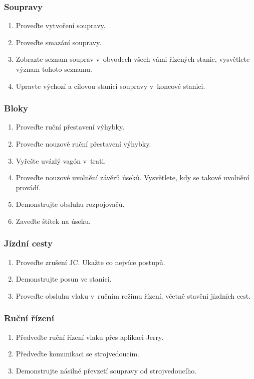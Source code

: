 \documentclass[12pt,a4paper]{article}
\begin{document}
\subsubsection*{Soupravy}
\begin{enumerate}[leftmargin=*]
\item Proveďte vytvoření soupravy.
\item Proveďte smazání soupravy.
\item Zobrazte seznam souprav v~obvodech všech vámi řízených stanic, vysvětlete
význam tohoto seznamu.
\item Upravte výchozí a cílovou stanici soupravy v~koncové stanici.
\end{enumerate}

\subsubsection*{Bloky}
\begin{enumerate}[leftmargin=*]
\item Proveďte ruční přestavení výhybky.
\item Proveďte nouzové ruční přestavení výhybky.
\item Vyřešte uvázlý vagón v~trati.
\item Proveďte nouzové uvolnění závěrů úseků. Vysvětlete, kdy se takové uvolnění
provádí.
\item Demonstrujte obsluhu rozpojovačů.
\item Zaveďte štítek na úseku.
\end{enumerate}

\subsubsection*{Jízdní cesty}
\begin{enumerate}[leftmargin=*]
\item Proveďte zrušení JC. Ukažte co nejvíce postupů.
\item Demonstrujte posun ve stanici.
\item Proveďte obsluhu vlaku v~ručním režimu řízení, včetně stavění jízdních
cest.
\end{enumerate}

\subsubsection*{Ruční řízení}
\begin{enumerate}[leftmargin=*]
\item Předveďte ruční řízení vlaku přes aplikaci Jerry.
\item Předveďte komunikaci se strojvedoucím.
\item Demonstrujte násilné převzetí soupravy od strojvedoucího.
\end{enumerate}
\end{document}
